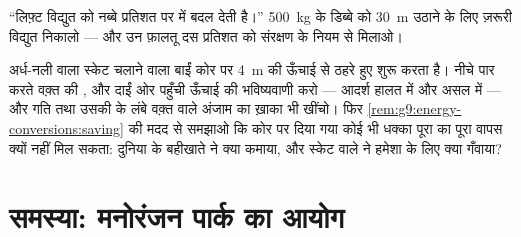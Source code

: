 \begin{exercise}[$\star\star$]\label{exo:g9:energy-conversions:11}
``लिफ़्ट विद्युत  को नब्बे प्रतिशत  पर  में
बदल देती है।'' \qty{500}{kg} के डिब्बे को \qty{30}{m} उठाने के लिए
ज़रूरी विद्युत  निकालो --- और उन फ़ालतू दस प्रतिशत को संरक्षण के
नियम से मिलाओ।
\end{exercise}

\begin{exercise}[$\star\star\star$]\label{exo:g9:energy-conversions:12}
अर्ध-नली वाला स्केट चलाने वाला बाईं कोर पर \qty{4}{m} की ऊँचाई से
ठहरे हुए शुरू करता है। नीचे पार करते वक़्त की , और दाईं ओर पहुँची
ऊँचाई की भविष्यवाणी करो --- आदर्श हालत में और असल में --- और गति तथा
उसकी  के लंबे वक़्त वाले अंजाम का ख़ाका भी खींचो। फिर
\cref{rem:g9:energy-conversions:saving} की मदद से समझाओ कि कोर पर दिया
गया कोई भी धक्का पूरा का पूरा वापस क्यों नहीं मिल सकता: दुनिया के
बहीखाते ने क्या कमाया, और स्केट वाले ने हमेशा के लिए क्या गँवाया?
\end{exercise}

\section{समस्या: मनोरंजन पार्क का आयोग}

